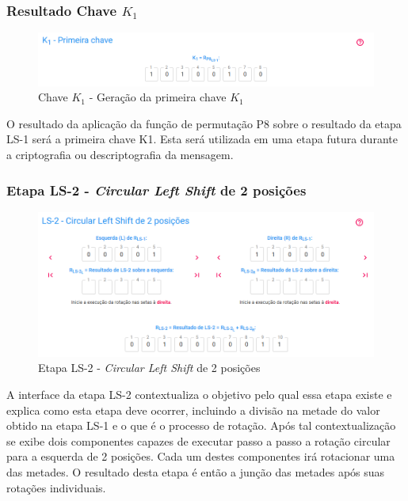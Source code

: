 \subsubsection{Resultado Chave \(K_1\)}

\begin{figure}[H]
    \centering
    \caption{Chave \(K_1\) - Geração da primeira chave \(K_1\)}
    \includegraphics[width=1\linewidth]{UI/UIK1.png}
\end{figure}

O resultado da aplicação da função de permutação P8 sobre o resultado da etapa LS-1 será a primeira chave K1. Esta será utilizada em uma etapa futura durante a criptografia ou descriptografia da mensagem.

\subsubsection{Etapa LS-2 - \textit{Circular Left Shift} de 2 posições}

\begin{figure}[H]
    \centering
    \caption{Etapa LS-2 - \textit{Circular Left Shift} de 2 posições}
    \includegraphics[width=1\linewidth]{UI/UILS2.png}
\end{figure}

A interface da etapa LS-2 contextualiza o objetivo pelo qual essa etapa existe e explica como esta etapa deve ocorrer, incluindo a divisão na metade do valor obtido na etapa LS-1 e o que é o processo de rotação. Após tal contextualização se exibe dois componentes capazes de executar passo a passo a rotação circular para a esquerda de 2 posições. Cada um destes componentes irá rotacionar uma das metades. O resultado desta etapa é então a junção das metades após suas rotações individuais.

